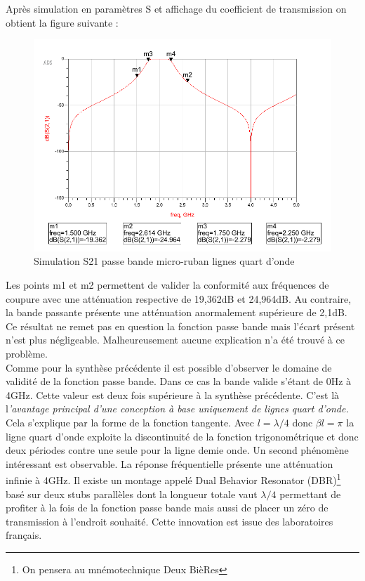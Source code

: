\documentclass[french]{article}
\begin{document}
Après simulation en paramètres S et affichage du coefficient de transmission on obtient la figure suivante :
\begin{figure}[H]
	\centering
	\includegraphics[width=0.7\linewidth]{../4synthPBande/inverseur_impedance/resultat_simulation}
	\caption{Simulation S21 passe bande micro-ruban lignes quart d'onde}
	\label{fig:resultatsimulation}
\end{figure}

Les points m1 et m2 permettent de valider la conformité aux fréquences de coupure avec une atténuation respective de 19,362dB et 24,964dB. Au contraire, la bande passante présente une atténuation anormalement supérieure de 2,1dB. Ce résultat ne remet pas en question la fonction passe bande mais l'écart présent n'est plus négligeable. Malheureusement aucune explication n'a été trouvé à ce problème. \\

Comme pour la synthèse précédente il est possible d'observer le domaine de validité de la fonction passe bande. Dans ce cas la bande valide s'étant de 0Hz à 4GHz. Cette valeur est deux fois supérieure à la synthèse précédente. C'est là l\emph{'avantage principal d'une conception à base uniquement de lignes quart d'onde.} Cela s'explique par la forme de la fonction tangente. Avec $l=\lambda/4$ donc $\beta l = \pi$ la ligne quart d'onde exploite la discontinuité de la fonction trigonométrique et donc deux périodes contre une seule pour la ligne demie onde. Un second phénomène intéressant est observable. La réponse fréquentielle présente une atténuation infinie à 4GHz. Il existe un montage appelé Dual Behavior Resonator (DBR)\footnote{On pensera au mnémotechnique Deux BièRes} basé sur deux stubs parallèles dont la longueur totale vaut $\lambda/4$ permettant de profiter à la fois de la fonction passe bande mais aussi de placer un zéro de transmission à l'endroit souhaité. Cette innovation est issue des laboratoires français. 
\newpage
\end{document}

